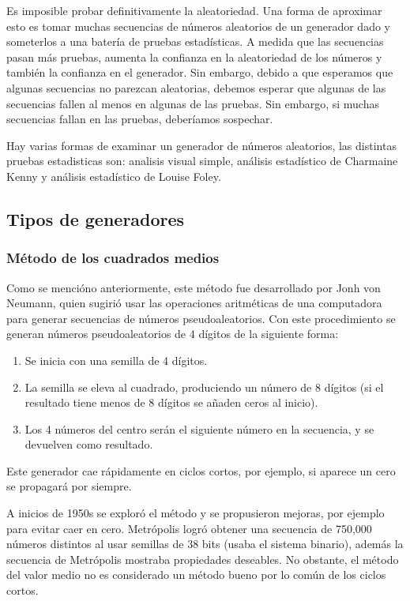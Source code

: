 Es imposible probar definitivamente la aleatoriedad. Una forma de aproximar esto es tomar muchas secuencias de números aleatorios de un generador dado y someterlos a una batería de pruebas estadísticas. A medida que las secuencias pasan más pruebas, aumenta la confianza en la aleatoriedad de los números y también la confianza en el generador. Sin embargo, debido a que esperamos que algunas secuencias no parezcan aleatorias, debemos esperar que algunas de las secuencias fallen al menos en algunas de las pruebas. Sin embargo, si muchas secuencias fallan en las pruebas, deberíamos sospechar.

Hay varias formas de examinar un generador de números aleatorios, las distintas pruebas estadisticas son: analisis visual simple, análisis estadístico de Charmaine Kenny y análisis estadístico de Louise Foley.

\subsection{Tipos de generadores}
\subsubsection{Método de los cuadrados medios}
Como se mencióno anteriormente, este método fue desarrollado por Jonh von Neumann, quien sugirió usar las operaciones aritméticas de una computadora para generar secuencias de números pseudoaleatorios. Con este procedimiento se generan números pseudoaleatorios de 4 dígitos de la siguiente forma:
\begin{enumerate}
    \item Se inicia con una semilla de 4 dígitos.
    \item La semilla se eleva al cuadrado, produciendo un número de 8 dígitos (si el resultado tiene menos de 8 dígitos se añaden ceros al inicio). 
    \item Los 4 números del centro serán el siguiente número en la secuencia, y se devuelven como resultado. 
\end{enumerate}
Este generador cae rápidamente en ciclos cortos, por ejemplo, si aparece un cero se propagará por siempre.

A inicios de 1950s se exploró el método y se propusieron mejoras, por ejemplo para evitar caer en cero. Metrópolis logró obtener una secuencia de 750,000 números distintos al usar semillas de 38 bits (usaba el sistema binario), además la secuencia de Metrópolis mostraba propiedades deseables. No obstante, el método del valor medio no es considerado un método bueno por lo común de los ciclos cortos.

